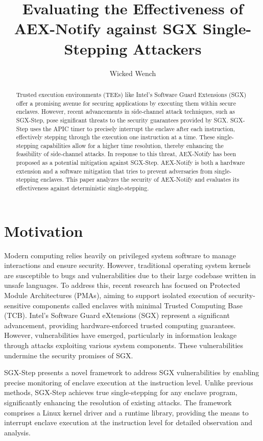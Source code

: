 \documentclass{llncs}
\title{Evaluating the Effectiveness of AEX-Notify against SGX Single-Stepping Attackers}
\author{Wicked Wench}
\institute{	University of L\"ubeck, Germany}
\begin{document}
\maketitle

\begin{abstract}
  Trusted execution environments (TEEs) like Intel's Software Guard Extensions (SGX)
  offer a promising avenue for securing applications by executing them within secure enclaves.
  However, recent advancements in side-channel attack techniques, such as SGX-Step,
  pose significant threats to the security guarantees provided by SGX.
  SGX-Step uses the APIC timer to precisely interrupt the enclave after each instruction,
  effectively stepping through the execution one instruction at a time.
  These single-stepping capabilities allow for a higher time resolution,
  thereby enhancing the feasibility of side-channel attacks.
  In response to this threat, AEX-Notify has been proposed as a potential mitigation against SGX-Step.
  AEX-Notify is both a hardware extension and a software mitigation that tries
  to prevent adversaries from single-stepping enclaves.
  This paper analyzes the security of AEX-Notify and evaluates its
  effectiveness against deterministic single-stepping.
\end{abstract}

\section{Motivation}

Modern computing relies heavily on privileged system software to manage interactions and ensure security.
However, traditional operating system kernels are susceptible to bugs and vulnerabilities
due to their large codebase written in unsafe languages.
To address this, recent research has focused on Protected Module Architectures (PMAs),
aiming to support isolated execution of security-sensitive components
called enclaves with minimal Trusted Computing Base (TCB).
Intel’s Software Guard eXtensions (SGX) \cite{Intel16,Intel17} represent a significant advancement,
providing hardware-enforced trusted computing guarantees.
However, vulnerabilities have emerged, particularly in information leakage
through attacks exploiting various system components.
These vulnerabilities undermine the security promises of SGX.

SGX-Step presents a novel framework to address SGX vulnerabilities by enabling
precise monitoring of enclave execution at the instruction level.
Unlike previous methods, SGX-Step achieves true single-stepping for any enclave program,
significantly enhancing the resolution of existing attacks.
The framework comprises a Linux kernel driver and a runtime library,
providing the means to interrupt enclave execution at the instruction level
for detailed observation and analysis.
\end{document}
